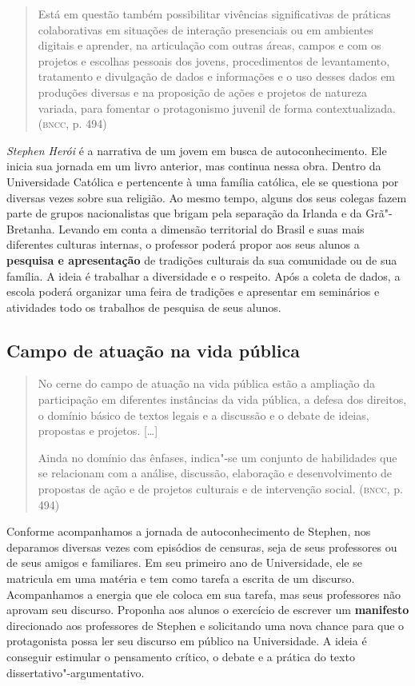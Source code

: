 \documentclass[12pt]{extarticle}
\begin{document}
{\begin{quote}
Está em questão também possibilitar vivências significativas de práticas
colaborativas em situações de interação presenciais ou em ambientes
digitais e aprender, na articulação com outras áreas, campos e com os
projetos e escolhas pessoais dos jovens, procedimentos de levantamento,
tratamento e divulgação de dados e informações e o uso desses dados em
produções diversas e na proposição de ações e projetos de natureza
variada, para fomentar o protagonismo juvenil de forma
contextualizada. (\textsc{bncc}, p. 494)
\end{quote}

\emph{Stephen Herói} é a narrativa de um jovem em busca de
autoconhecimento. Ele inicia sua jornada em um livro anterior, mas
continua nessa obra. Dentro da Universidade Católica e pertencente à
uma família católica, ele se questiona por diversas vezes sobre sua
religião. Ao mesmo tempo, alguns dos seus colegas fazem parte de
grupos nacionalistas que brigam pela separação da Irlanda e da
Grã"-Bretanha. Levando em conta a dimensão territorial do Brasil e suas
mais diferentes culturas internas, o professor poderá propor aos seus
alunos a \textbf{pesquisa e apresentação} de tradições culturais da
sua comunidade ou de sua família. A ideia é trabalhar a diversidade e
o respeito. Após a coleta de dados, a escola poderá organizar uma
feira de tradições e apresentar em seminários e atividades todo os
trabalhos de pesquisa de seus alunos.

\subsection{Campo de atuação na vida pública}

\begin{quote}
No cerne do campo de atuação na vida pública estão a ampliação da
participação em diferentes instâncias da vida pública, a defesa dos
direitos, o domínio básico de textos legais e a discussão e o debate de
ideias, propostas e projetos. {[}\ldots{}{]}

Ainda no domínio das ênfases, indica"-se um conjunto de habilidades que
se relacionam com a análise, discussão, elaboração e desenvolvimento de
propostas de ação e de projetos culturais e de intervenção social.
(\textsc{bncc}, p. 494)
\end{quote}

Conforme acompanhamos a jornada de autoconhecimento de Stephen, nos
deparamos diversas vezes com episódios de censuras, seja de seus
professores ou de seus amigos e familiares. Em seu primeiro ano de
Universidade, ele se matricula em uma matéria e tem como tarefa a
escrita de um discurso. Acompanhamos a energia que ele coloca em sua
tarefa, mas seus professores não aprovam seu discurso. Proponha aos
alunos o exercício de escrever um \textbf{manifesto} direcionado aos
professores de Stephen e solicitando uma nova chance para que o
protagonista possa ler seu discurso em público na Universidade. A
ideia é conseguir estimular o pensamento crítico, o debate e a prática
do texto dissertativo"-argumentativo.

}
\end{document}

